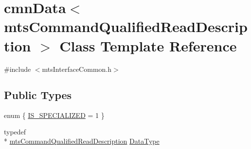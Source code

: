 \hypertarget{classcmn_data_3_01mts_command_qualified_read_description_01_4}{\section{cmn\-Data$<$ mts\-Command\-Qualified\-Read\-Description $>$ Class Template Reference}
\label{classcmn_data_3_01mts_command_qualified_read_description_01_4}
}


{\ttfamily \#include $<$mts\-Interface\-Common.\-h$>$}

\subsection*{Public Types}
\begin{DoxyCompactItemize}
\item 
enum \{ \hyperlink{classcmn_data_3_01mts_command_qualified_read_description_01_4_a11f36fde8fbdd159da4585fc452d3572ad7df40cb2dad2bfe87d4f22209cde01f}{I\-S\-\_\-\-S\-P\-E\-C\-I\-A\-L\-I\-Z\-E\-D} = 1
 \}
\item 
typedef \\*
\hyperlink{classmts_command_qualified_read_description}{mts\-Command\-Qualified\-Read\-Description} \hyperlink{classcmn_data_3_01mts_command_qualified_read_description_01_4_a806c74676540892a3a54aed2f6e4d040}{Data\-Type}
\end{DoxyCompactItemize}

